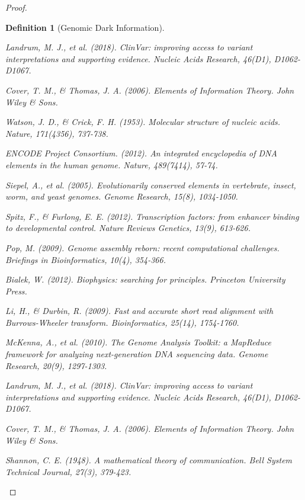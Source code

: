 \documentclass[12pt,a4paper]{article}
\newtheorem{definition}{Definition}
\begin{document}
\begin{proof}
\begin{definition}[Genomic Dark Information]
\begin{algorithm}[H]
\begin{thebibliography}{99}
Landrum, M. J., et al. (2018). ClinVar: improving access to variant interpretations and supporting evidence. \textit{Nucleic Acids Research}, 46(D1), D1062-D1067.

Cover, T. M., \& Thomas, J. A. (2006). \textit{Elements of Information Theory}. John Wiley \& Sons.

Watson, J. D., \& Crick, F. H. (1953). Molecular structure of nucleic acids. \textit{Nature}, 171(4356), 737-738.

ENCODE Project Consortium. (2012). An integrated encyclopedia of DNA elements in the human genome. \textit{Nature}, 489(7414), 57-74.

Siepel, A., et al. (2005). Evolutionarily conserved elements in vertebrate, insect, worm, and yeast genomes. \textit{Genome Research}, 15(8), 1034-1050.

Spitz, F., \& Furlong, E. E. (2012). Transcription factors: from enhancer binding to developmental control. \textit{Nature Reviews Genetics}, 13(9), 613-626.

Pop, M. (2009). Genome assembly reborn: recent computational challenges. \textit{Briefings in Bioinformatics}, 10(4), 354-366.

Bialek, W. (2012). \textit{Biophysics: searching for principles}. Princeton University Press.


Li, H., \& Durbin, R. (2009). Fast and accurate short read alignment with Burrows-Wheeler transform. \textit{Bioinformatics}, 25(14), 1754-1760.

McKenna, A., et al. (2010). The Genome Analysis Toolkit: a MapReduce framework for analyzing next-generation DNA sequencing data. \textit{Genome Research}, 20(9), 1297-1303.

Landrum, M. J., et al. (2018). ClinVar: improving access to variant interpretations and supporting evidence. \textit{Nucleic Acids Research}, 46(D1), D1062-D1067.

Cover, T. M., \& Thomas, J. A. (2006). \textit{Elements of Information Theory}. John Wiley \& Sons.

Shannon, C. E. (1948). A mathematical theory of communication. \textit{Bell System Technical Journal}, 27(3), 379-423.


\end{thebibliography}
\end{algorithm}
\end{definition}
\end{proof}
\end{document}
